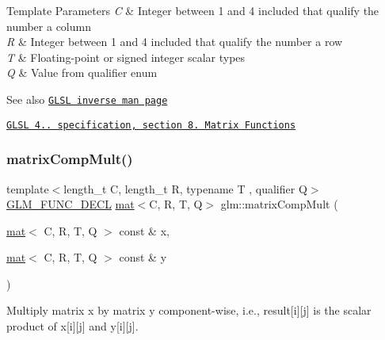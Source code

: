 \begin{DoxyTemplParams}{Template Parameters}
{\em C} & Integer between 1 and 4 included that qualify the number a column \\
\hline
{\em R} & Integer between 1 and 4 included that qualify the number a row \\
\hline
{\em T} & Floating-\/point or signed integer scalar types \\
\hline
{\em Q} & Value from qualifier enum\\
\hline
\end{DoxyTemplParams}
\begin{DoxySeeAlso}{See also}
\href{http://www.opengl.org/sdk/docs/manglsl/xhtml/inverse.xml}{\tt G\+L\+SL inverse man page} 

\href{http://www.opengl.org/registry/doc/GLSLangSpec.4.20.8.pdf}{\tt G\+L\+SL 4.. specification, section 8. Matrix Functions} 
\end{DoxySeeAlso}
\mbox{\label{group__core__func__matrix_gaf14569404c779fedca98d0b9b8e58c1f}} 
\subsubsection{\texorpdfstring{matrix\+Comp\+Mult()}{matrixCompMult()}}
{\footnotesize\ttfamily template$<$length\+\_\+t C, length\+\_\+t R, typename T , qualifier Q$>$ \\
\mbox{\hyperlink{setup_8hpp_ab2d052de21a70539923e9bcbf6e83a51}{G\+L\+M\+\_\+\+F\+U\+N\+C\+\_\+\+D\+E\+CL}} \mbox{\hyperlink{structglm_1_1mat}{mat}}$<$C, R, T, Q$>$ glm\+::matrix\+Comp\+Mult (\begin{DoxyParamCaption}\item[{\mbox{\hyperlink{structglm_1_1mat}{mat}}$<$ C, R, T, Q $>$ const \&}]{x,  }\item[{\mbox{\hyperlink{structglm_1_1mat}{mat}}$<$ C, R, T, Q $>$ const \&}]{y }\end{DoxyParamCaption})}

Multiply matrix x by matrix y component-\/wise, i.\+e., result\mbox{[}i\mbox{]}\mbox{[}j\mbox{]} is the scalar product of x\mbox{[}i\mbox{]}\mbox{[}j\mbox{]} and y\mbox{[}i\mbox{]}\mbox{[}j\mbox{]}.


